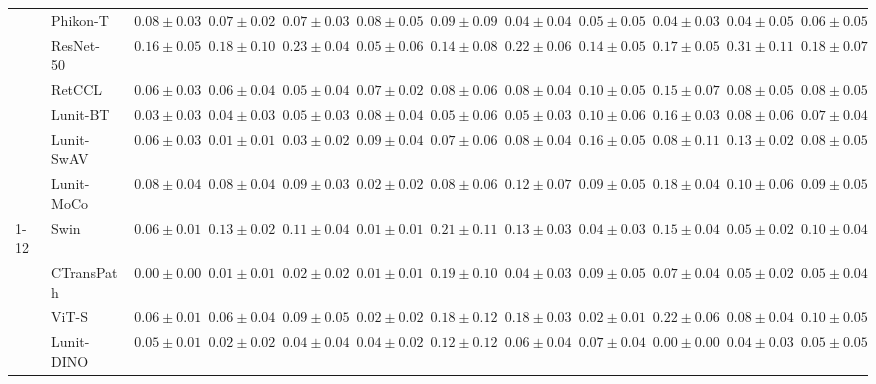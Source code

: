 \begin{tabular}{ll|cccc|c|cccc|c}
 & Phikon-T~\cite{filiot2023scaling} & $0.08 \pm 0.03$ & $0.07 \pm 0.02$ & $0.07 \pm 0.03$ & $0.08 \pm 0.05$ & $0.09 \pm 0.09$ & $0.04 \pm 0.04$ & $\mathbf{0.05 \pm 0.05}$ & $\mathbf{0.04 \pm 0.03}$ & $\mathbf{0.04 \pm 0.05}$ & $0.06 \pm 0.05$ \\
 & ResNet-50~\cite{he2015deep} & $0.16 \pm 0.05$ & $0.18 \pm 0.10$ & $0.23 \pm 0.04$ & $0.05 \pm 0.06$ & $0.14 \pm 0.08$ & $0.22 \pm 0.06$ & $0.14 \pm 0.05$ & $0.17 \pm 0.05$ & $0.31 \pm 0.11$ & $0.18 \pm 0.07$ \\
 & RetCCL~\cite{wang2023retccl} & $0.06 \pm 0.03$ & $0.06 \pm 0.04$ & $0.05 \pm 0.04$ & $0.07 \pm 0.02$ & $0.08 \pm 0.06$ & $0.08 \pm 0.04$ & $0.10 \pm 0.05$ & $0.15 \pm 0.07$ & $0.08 \pm 0.05$ & $0.08 \pm 0.05$ \\
 & Lunit-BT~\cite{kang2023benchmarking} & $0.03 \pm 0.03$ & $0.04 \pm 0.03$ & $0.05 \pm 0.03$ & $0.08 \pm 0.04$ & $0.05 \pm 0.06$ & $0.05 \pm 0.03$ & $0.10 \pm 0.06$ & $0.16 \pm 0.03$ & $0.08 \pm 0.06$ & $0.07 \pm 0.04$ \\
 & Lunit-SwAV~\cite{kang2023benchmarking} & $0.06 \pm 0.03$ & $\mathbf{0.01 \pm 0.01}$ & $0.03 \pm 0.02$ & $0.09 \pm 0.04$ & $0.07 \pm 0.06$ & $0.08 \pm 0.04$ & $0.16 \pm 0.05$ & $0.08 \pm 0.11$ & $0.13 \pm 0.02$ & $0.08 \pm 0.05$ \\
 & Lunit-MoCo~\cite{kang2023benchmarking} & $0.08 \pm 0.04$ & $0.08 \pm 0.04$ & $0.09 \pm 0.03$ & $\mathbf{0.02 \pm 0.02}$ & $0.08 \pm 0.06$ & $0.12 \pm 0.07$ & $0.09 \pm 0.05$ & $0.18 \pm 0.04$ & $0.10 \pm 0.06$ & $0.09 \pm 0.05$ \\
\cline{1-12}
\multirow[t]{12}{*}{Mean pool} & Swin~\cite{liu2021swin} & $0.06 \pm 0.01$ & $0.13 \pm 0.02$ & $0.11 \pm 0.04$ & $0.01 \pm 0.01$ & $0.21 \pm 0.11$ & $0.13 \pm 0.03$ & $0.04 \pm 0.03$ & $0.15 \pm 0.04$ & $0.05 \pm 0.02$ & $0.10 \pm 0.04$ \\
 & CTransPath~\cite{wang2022transformer} & $\mathbf{0.00 \pm 0.00}$ & $0.01 \pm 0.01$ & $\mathbf{0.02 \pm 0.02}$ & $\mathbf{0.01 \pm 0.01}$ & $0.19 \pm 0.10$ & $0.04 \pm 0.03$ & $0.09 \pm 0.05$ & $0.07 \pm 0.04$ & $0.05 \pm 0.02$ & $0.05 \pm 0.04$ \\
 & ViT-S~\cite{kolesnikov2021image} & $0.06 \pm 0.01$ & $0.06 \pm 0.04$ & $0.09 \pm 0.05$ & $0.02 \pm 0.02$ & $0.18 \pm 0.12$ & $0.18 \pm 0.03$ & $\mathbf{0.02 \pm 0.01}$ & $0.22 \pm 0.06$ & $0.08 \pm 0.04$ & $0.10 \pm 0.05$ \\
 & Lunit-DINO~\cite{kang2023benchmarking} & $0.05 \pm 0.01$ & $0.02 \pm 0.02$ & $0.04 \pm 0.04$ & $0.04 \pm 0.02$ & $\mathbf{0.12 \pm 0.12}$ & $0.06 \pm 0.04$ & $0.07 \pm 0.04$ & $\mathbf{0.00 \pm 0.00}$ & $0.04 \pm 0.03$ & $\mathbf{0.05 \pm 0.05}$ \\

\end{tabular}
